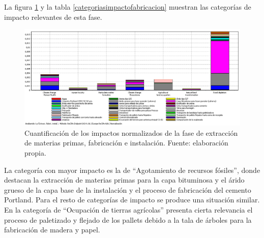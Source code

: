 La figura \ref{fig:fabric_normalizacion} y la tabla \ref{categoriasimpactofabricacion} muestran las categorías de impacto relevantes de esta fase.

\begin{figure}[!htb]
\centering
\includegraphics[width=15cm]{img/fabric_normalizacion.png}
\caption[Cuantificación de los impactos normalizados de la fase de extracción de materias primas, fabricación e instalación.]{Cuantificación de los impactos normalizados de la fase de extracción de materias primas, fabricación e instalación. Fuente: elaboración propia.}
\label{fig:fabric_normalizacion}
\end{figure}

La categoría con mayor impacto es la de ``Agotamiento de recursos fósiles'', donde destacan la extracción de materias primas para la capa bituminosa y el árido grueso de la capa base de la instalación y el proceso de fabricación del cemento Portland. Para el resto de categorías de impacto se produce una situación similar. En la categoría de ``Ocupación de tierras agrícolas'' presenta cierta relevancia el proceso de paletizado y flejado de los pallets debido a la tala de árboles para la fabricación de madera y papel.


